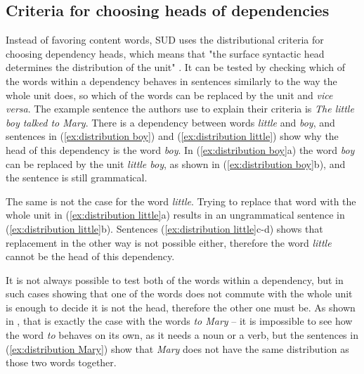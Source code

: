 \subsection{Criteria for choosing heads of dependencies}\label{sec:sud criteria}
Instead of favoring content words, SUD uses the distributional criteria for choosing dependency heads, which means that "the surface syntactic head determines the distribution of the unit" \citep{gerdes-etal-2018-sud}. It can be tested by checking which of the words within a dependency behaves in sentences similarly to the way the whole unit does, so which of the words can be replaced by the unit and \textsl{vice versa}. The example sentence the authors use to explain their criteria is \textsl{The little boy talked to Mary}. There is a dependency between words \textsl{little} and \textsl{boy}, and sentences in (\ref{ex:distribution boy}) and (\ref{ex:distribution little}) show why the head of this dependency is the word \textsl{boy}. In (\ref{ex:distribution boy}a) the word \textsl{boy} can be replaced by the unit \textsl{little boy}, as shown in (\ref{ex:distribution boy}b), and the sentence is still grammatical. 

\begin{exe}
    \ex
    \label{ex:distribution boy}
    \begin{xlist}
    \end{xlist}
\end{exe}

The same is not the case for the word \textsl{little}. Trying to replace that word with the whole unit in (\ref{ex:distribution little}a) results in an ungrammatical sentence in (\ref{ex:distribution little}b). Sentences (\ref{ex:distribution little}c-d) shows that replacement in the other way is not possible either, therefore the word \textsl{little} cannot be the head of this dependency.

\begin{exe}
    \ex
    \label{ex:distribution little}
	\begin{xlist}
    \end{xlist}
\end{exe}

It is not always possible to test both of the words within a dependency, but in such cases showing that one of the words does not commute with the whole unit is enough to decide it is not the head, therefore the other one must be. As shown in \cite{gerdes-etal-2018-sud}, that is exactly the case with the words \textsl{to Mary} -- it is impossible to see how the word \textsl{to} behaves on its own, as it needs a noun or a verb, but the sentences in (\ref{ex:distribution Mary}) show that \textsl{Mary} does not have the same distribution as those two words together.

